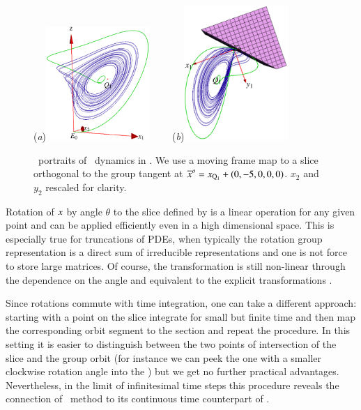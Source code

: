 {%
\begin{figure}[ht]
\begin{center}
  (\textit{a})\includegraphics[width=0.35\textwidth,clip=true]{../figs/CLEmfAdHoc1}
~~~~(\textit{b})\includegraphics[width=0.35\textwidth,clip=true]{../figs/CLEmfAdHoc135}
\end{center}
\caption{
\Statesp\ portraits of \cLe\ dynamics in \reducedsp. We use a
moving frame map to a slice orthogonal to the group tangent
at ${\overline{x}^o}  = x_{\mathrm{Q}_{1}}+(0,-5,0,0,0)$. $x_2$ and $y_2$
rescaled for clarity.
    }
\label{fig:CLEmfAdHoc}
\end{figure}


}%


Rotation of $x$ by angle $\theta$
to the slice defined by  is a linear operation
for any given point and can be applied efficiently
even in a high dimensional space. This is especially true
for truncations of PDEs, when typically the rotation group
representation is a direct sum of irreducible
representations and one is not force to store large matrices.
Of course, the transformation is still non-linear
through the dependence on the angle and equivalent to the
explicit transformations .


Since rotations commute with time integration, one can take a
different approach: starting with a point on the slice
integrate for small but finite time and then map the
corresponding orbit segment to the section and repeat the
procedure. In this setting it is easier to distinguish
between the two points of intersection of the slice and the
group orbit (for instance we can peek the one with a smaller
clockwise rotation angle into the \slice) but we get no
further practical advantages. Nevertheless, in the limit of
infinitesimal time steps this procedure reveals the
connection of \mframes\ method to its continuous time
counterpart of .
